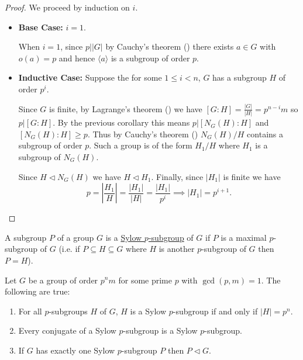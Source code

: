 \documentclass[11pt]{article}
\begin{document}
\begin{proof}
    We proceed by induction on $i$.
    \begin{itemize}
        \item\textbf{Base Case:} $i=1$.
    
        When $i=1$, since $p\big||G|$ by Cauchy's theorem () there exists $a\in G$ with $o(a)=p$ and hence $\langle a\rangle$ is a subgroup of order $p$.
    
        \item\textbf{Inductive Case:} Suppose the for some $1\leq i<n$, $G$ has a subgroup $H$ of order $p^i$.
    
        Since $G$ is finite, by Lagrange's theorem () we have $[G:H]=\frac{|G|}{|H|}=p^{n-i}m$ so $p|[G:H]$. By the previous corollary this means $p|[N_G(H):H]$ and $[N_G(H):H]\geq p$. Thus by Cauchy's theorem () $N_G(H)/H$ contains a subgroup of order $p$. Such a group is of the form $H_1/H$ where $H_1$ is a subgroup of $N_G(H)$.
    
        Since $H\lhd N_G(H)$ we have $H\lhd H_1$. Finally, since $|H_1|$ is finite we have
        \[p=\left|\frac{H_1}{H}\right|=\frac{|H_1|}{|H|}=\frac{|H_1|}{p^i}\implies|H_1|=p^{i+1}.\]
    \end{itemize}
\end{proof}

\begin{definition}
    A subgroup $P$ of a group $G$ is a \ul{Sylow $p$-subgroup} of $G$ if $P$ is a maximal $p$-subgroup of $G$ (i.e. if $P\subseteq H\subseteq G$ where $H$ is another $p$-subgroup of $G$ then $P=H$).
\end{definition}

\begin{proposition}
    Let $G$ be a group of order $p^nm$ for some prime $p$ with $\gcd(p,m)=1$. The following are true:
    \begin{enumerate}
        \item For all $p$-subgroups $H$ of $G$, $H$ is a Sylow $p$-subgroup if and only if $|H|=p^n$.
        \item Every conjugate of a Sylow $p$-subgroup is a Sylow $p$-subgroup.
        \item If $G$ has exactly one Sylow $p$-subgroup $P$ then $P\lhd G$.
    \end{enumerate}
\end{proposition}
\end{document}
